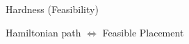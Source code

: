 \begin{frame}{Hardness \small (Feasibility)}

\onslide<+>
\onslide<+>
\begin{figure}
\centering

\end{figure}

\begin{center}
Hamiltonian path $\iff$ Feasible Placement
\end{center}
\end{frame}